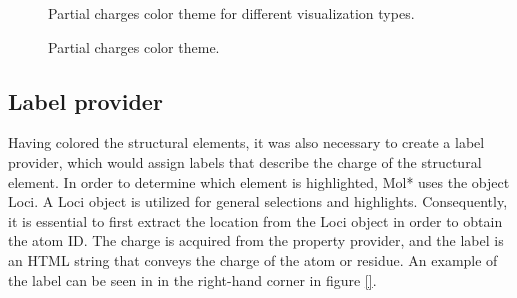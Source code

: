 \documentclass[
  digital,     %
  oneside,     %
  nosansbold,  %
  nocolorbold, %
  lof,         %
  lot,         %
]{fithesis4}
\begin{document}
\begin{figure}[htbp]
  \centering
  \caption{Partial charges color theme.}{Partial charges color theme for different visualization types.}
  \label{fig:partial_charges_color_theme}
\end{figure}

\subsection{Label provider}
\label{subsection:label_provider}


Having colored the structural elements, it was also necessary to create a label provider, which would assign labels that describe the charge of the structural element. In order to determine which element is highlighted, Mol* uses the object Loci. A Loci object is utilized for general selections and highlights. Consequently, it is essential to first extract the location from the Loci object in order to obtain the atom ID. The charge is acquired from the property provider, and the label is an HTML string that conveys the charge of the atom or residue. An example of the label can be seen in in the right-hand corner in figure \ref{}.
\end{document}
